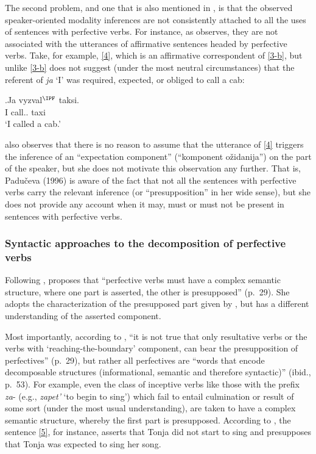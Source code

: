 The second problem, and one that is also mentioned in \citealt{Gronn:04}, is that the observed speaker-oriented modality inferences are not consistently attached to all the uses of sentences with perfective verbs. For instance, as \citet{Gronn:04} observes, they are not associated with the utterances of affirmative sentences headed by perfective verbs. Take, for example, \ref{4}, which is an affirmative correspondent of \ref{3-b}, but unlike \ref{3-b} does not suggest (under the most neutral circumstances) that the referent of \textit{ja} `I' was required, expected, or obliged to call a cab:

\exg.\label{4}Ja vyzval$^{\IPF}$ taksi.\\
 I call.. taxi\\
 \trans `I called a cab.'
 
\citet[56]{Paducheva:96} also observes that there is no reason to assume that the utterance of \ref{4} triggers the inference of an ``expectation component'' (``komponent o\v{z}idanija'') on the part of the speaker, but she does not motivate this observation any further. That is, Padu\v{c}eva (1996) is aware of the fact that not all the sentences with perfective verbs carry the relevant inference (or ``presupposition'' in her wide sense), but she does not provide any account when it may, must or must not be present in sentences with perfective verbs. 
 
\subsubsection{Syntactic approaches to the decomposition of perfective verbs}
Following \citet{Paducheva:96}, \citet{Romanova:06} proposes that ``perfective verbs must have a complex semantic structure, where one part is asserted, the other is presupposed'' (p.~29). She adopts the characterization of the presupposed part given by \citet{Paducheva:96}, but has a different understanding of the asserted component. 

 Most importantly, according to \citet{Romanova:06}, ``it is not true that only resultative verbs or the verbs with `reaching-the-boundary' component, can bear the presupposition of perfectives'' (p.~29), but rather all perfectives are ``words that encode decomposable structures (informational, semantic and therefore syntactic)'' (ibid., p.~53). For example, even the class of inceptive verbs like those with the prefix \textit{za}-  (e.g., \textit{zapet'} `to begin to sing') which fail to entail culmination or result of some sort (under the most usual understanding), are taken to have a complex semantic structure, whereby the first part is presupposed. According to \citet{Romanova:06}, the sentence \ref{5}, for instance, asserts that Tonja did not start to sing and presupposes that Tonja was expected to sing her song.
 

